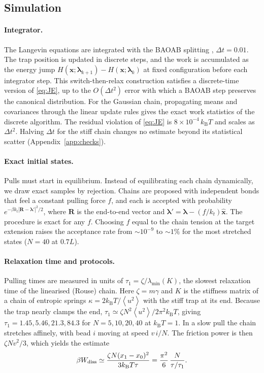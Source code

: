 \documentclass[11pt,a4paper]{article}
\newcommand{\kT}{k_{\mathrm B}T}
\newcommand{\avg}[1]{\left\langle #1\right\rangle}
\newcommand{\lam}{\bm{\lambda}}
\newcommand{\Wd}{W_{\rm diss}}
\begin{document}
\subsection{Simulation}

\paragraph{Integrator.} The Langevin equations are integrated with the BAOAB splitting \cite{LM13},
$\Delta t=0.01$. The trap position is updated in discrete steps, and the work is accumulated as the energy
jump $H(\bm x;\lam_{k+1})-H(\bm x;\lam_k)$ at fixed configuration before each integrator step. This
switch-then-relax construction satisfies a discrete-time version of \eqref{eq:JE}, up to the
$O(\Delta t^2)$ error with which a BAOAB step preserves the canonical distribution. For the Gaussian
chain, propagating means and covariances through the linear update rules gives the exact work statistics
of the discrete algorithm. The residual violation of \eqref{eq:JE} is $8\times10^{-4}\,\kT$ and scales as
$\Delta t^2$. Halving $\Delta t$ for the stiff chain changes no estimate beyond its statistical scatter
(Appendix~\ref{app:checks}).

\paragraph{Exact initial states.} Pulls must start in equilibrium. Instead of equilibrating each chain
dynamically, we draw exact samples by rejection. Chains are proposed with independent bonds that feel a
constant pulling force $f$, and each is accepted with probability $e^{-\beta k_t|\bm R-\lam'|^2/2}$, where
$\bm R$ is the end-to-end vector and $\lam'=\lam-(f/k_t)\hat{\bm x}$. The procedure is exact for any $f$.
Choosing $f$ equal to the chain tension at the target extension raises the acceptance rate from
$\sim10^{-9}$ to $\sim1\%$ for the most stretched states ($N=40$ at $0.7L$).

\paragraph{Relaxation time and protocols.} Pulling times are measured in units of $\tau_1=\zeta/\lambda_{\min}(K)$,
the slowest relaxation time of the linearised (Rouse) chain. Here $\zeta=m\gamma$ and $K$ is the stiffness matrix of a chain of
entropic springs $\kappa=2\kT/\avg{u^2}$ with the stiff trap at its end. Because the trap nearly clamps the end,
$\tau_1\simeq\zeta N^2\avg{u^2}/2\pi^2\kT$, giving $\tau_1=1.45,5.46,21.3,84.3$ for $N=5,10,20,40$ at $\kT=1$.
In a slow pull the chain stretches affinely, with bead $i$ moving at speed $v\,i/N$. The friction power is then
$\zeta Nv^2/3$, which yields the estimate
\begin{equation}
\beta\Wd\simeq\frac{\zeta N(x_1-x_0)^2}{3\kT\tau}=\frac{\pi^2}{6}\,\frac{N}{\tau/\tau_1}.
\label{eq:affine}
\end{equation}
\end{document}
